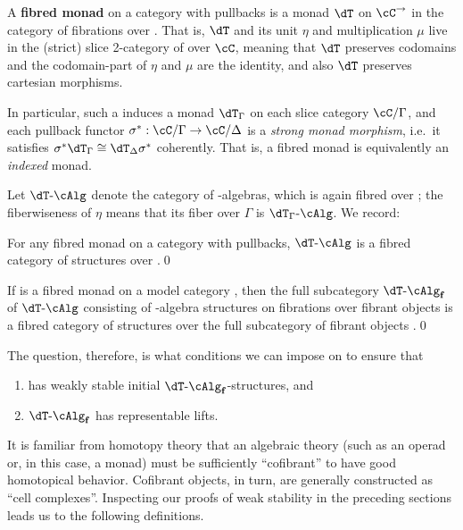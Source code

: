 \documentclass[referee]{psp}
\def\alg{\text{-}\cAlg}
\def\algf{\alg_{\mathbf{f}}}
\let\C\cC
\begin{document}
\begin{defn}
  A \textbf{fibred monad} on a category \C with pullbacks is a monad $\dT$ on $\C^\to$ in the category of fibrations over \C.
  That is, $\dT$ and its unit $\eta$ and multiplication $\mu$ live in the (strict) slice 2-category of \cCat over $\C$, meaning that $\dT$ preserves codomains and the codomain-part of $\eta$ and $\mu$ are the identity, and also $\dT$ preserves cartesian morphisms.
\end{defn}

In particular, such a \dT induces a monad $\dT_\Gamma$ on each slice category $\C/\Gamma$, and each pullback functor $\sigma^* : \C/\Gamma \to \C/\Delta$ is a \emph{strong monad morphism}, i.e.\ it satisfies $\sigma^* \dT_\Gamma \cong \dT_\Delta \sigma^*$ coherently.
That is, a fibred monad is equivalently an \emph{indexed} monad.

Let $\dT\alg$ denote the category of \dT-algebras, which is again fibred over \C; the fiberwiseness of $\eta$ means that its fiber over $\Gamma$ is $\dT_\Gamma\alg$.
We record:

\begin{lem}
  For any fibred monad \dT on a category \C with pullbacks, $\dT\alg$ is a fibred category of structures over \C.\qed
\end{lem}

\begin{lem}
  If \dT is a fibred monad on a model category \sM, then the full subcategory $\dT\algf$ of $\dT\alg$ consisting of \dT-algebra structures on fibrations over fibrant objects is a fibred category of structures over the full subcategory of fibrant objects \Mf.\qed
\end{lem}

The question, therefore, is what conditions we can impose on \dT to ensure that
\begin{enumerate}
\renewcommand{\theenumi}{(\arabic{enumi})}
\item \fibmf has weakly stable initial $\dT\algf$-structures, and
\item $\dT\algf$ has representable lifts.
\end{enumerate}
It is familiar from homotopy theory that an algebraic theory (such as an operad or, in this case, a monad) must be sufficiently ``cofibrant'' to have good homotopical behavior.
Cofibrant objects, in turn, are generally constructed as ``cell complexes''.
Inspecting our proofs of weak stability in the preceding sections leads us to the following definitions.
\end{document}
